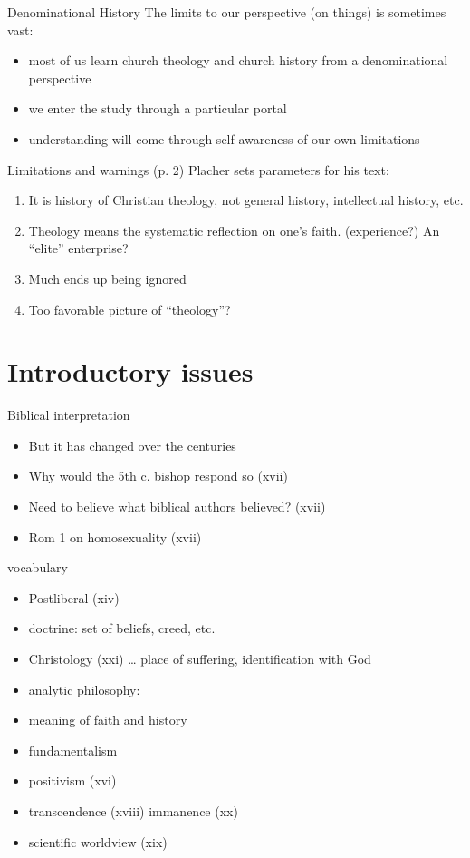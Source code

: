 \begin{frame}[label=sec-1-4]{Denominational History}
The limits to our perspective (on things) is sometimes vast:
\begin{itemize}[<+->]
\item most of us learn church theology and church history from a denominational perspective
\item we enter the study through a particular portal
\item understanding will come through self-awareness of our own limitations
\end{itemize}
\end{frame}

\begin{frame}[label=sec-1-5]{Limitations and warnings (p. 2)}
Placher sets parameters for his text:
\begin{enumerate}[<+->]
\item It is history of Christian theology, not general history, intellectual history, etc.
\item Theology means the systematic reflection on one's faith. (experience?) An ``elite'' enterprise?
\item Much ends up being ignored
\item Too favorable picture of ``theology''?
\end{enumerate}
\end{frame}

\section{Introductory issues}
\label{sec-2}
\begin{frame}[label=sec-2-1]{Biblical interpretation}
\begin{itemize}
\item But it has changed over the centuries
\item Why would the 5th c. bishop respond so (xvii)
\item Need to believe what biblical authors believed? (xvii)
\item Rom 1 on homosexuality (xvii)
\end{itemize}
\end{frame}

\begin{frame}[label=sec-2-2]{vocabulary}
\begin{itemize}
\item Postliberal (xiv)
\item doctrine: set of beliefs, creed, etc.
\item Christology (xxi) \ldots{} place of suffering, identification with God
\item analytic philosophy:
\item meaning of faith and history
\item fundamentalism
\item positivism (xvi)
\item transcendence (xviii) immanence (xx)
\item scientific worldview (xix)
\end{itemize}
\end{frame}

